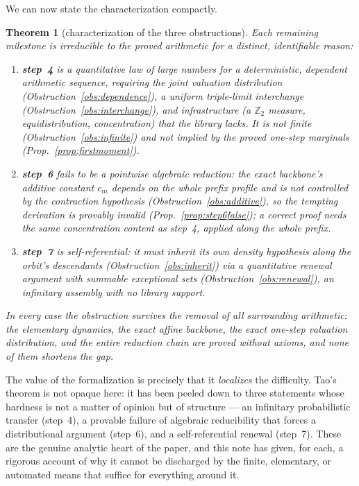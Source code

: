 \documentclass[11pt]{article}
\theoremstyle{plain}
\newtheorem{thm}{Theorem}[section]
\theoremstyle{definition}
\theoremstyle{remark}
\newcommand{\Z}{\mathbb{Z}}
\newcommand{\Ztwo}{\Z_2}
\begin{document}
We can now state the characterization compactly.

\begin{thm}[characterization of the three obstructions]\label{thm:char}
Each remaining milestone is irreducible to the proved arithmetic for a distinct,
identifiable reason:
\begin{enumerate}[label=\textbf{(\arabic*)}]
  \item \textbf{step~4} is a \emph{quantitative law of large numbers for a
        deterministic, dependent arithmetic sequence}, requiring the joint
        valuation distribution (Obstruction~\ref{obs:dependence}), a uniform
        triple-limit interchange (Obstruction~\ref{obs:interchange}), and
        infrastructure (a $\Ztwo$ measure, equidistribution, concentration) that
        the library lacks. It is not finite (Obstruction~\ref{obs:infinite}) and
        not implied by the proved one-step marginals
        (Prop.~\ref{prop:firstmoment}).
  \item \textbf{step~6} fails to be a pointwise algebraic reduction: the exact
        backbone's additive constant $c_m$ depends on the whole prefix profile
        and is not controlled by the contraction hypothesis
        (Obstruction~\ref{obs:additive}), so the tempting derivation is
        \emph{provably invalid} (Prop.~\ref{prop:step6false}); a correct proof
        needs the same concentration content as step~4, applied along the whole
        prefix.
  \item \textbf{step~7} is \emph{self-referential}: it must inherit its own
        density hypothesis along the orbit's descendants
        (Obstruction~\ref{obs:inherit}) via a quantitative renewal argument with
        summable exceptional sets (Obstruction~\ref{obs:renewal}), an
        infinitary assembly with no library support.
\end{enumerate}
In every case the obstruction survives the removal of all surrounding
arithmetic: the elementary dynamics, the exact affine backbone, the exact
one-step valuation distribution, and the entire reduction chain are proved
without axioms, and none of them shortens the gap.
\end{thm}

The value of the formalization is precisely that it \emph{localizes} the
difficulty. Tao's theorem is not opaque here: it has been peeled down to three
statements whose hardness is not a matter of opinion but of structure --- an
infinitary probabilistic transfer (step~4), a provable failure of algebraic
reducibility that forces a distributional argument (step~6), and a
self-referential renewal (step~7). These are the genuine analytic heart of the
paper, and this note has given, for each, a rigorous account of why it cannot be
discharged by the finite, elementary, or automated means that suffice for
everything around it.
\end{document}
